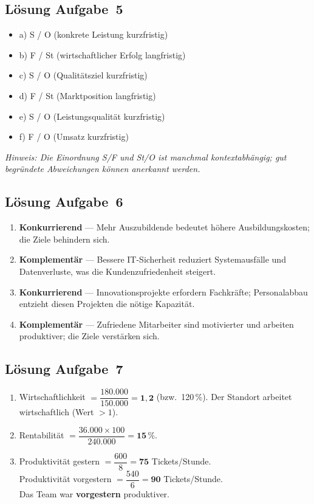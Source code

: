 \documentclass[11pt, a4paper]{article}
\begin{document}
\subsection*{Lösung Aufgabe~5}

\begin{itemize}
  \item a) S / O (konkrete Leistung kurzfristig)
  \item b) F / St (wirtschaftlicher Erfolg langfristig)
  \item c) S / O (Qualitätsziel kurzfristig)
  \item d) F / St (Marktposition langfristig)
  \item e) S / O (Leistungsqualität kurzfristig)
  \item f) F / O (Umsatz kurzfristig)
\end{itemize}

\textit{Hinweis: Die Einordnung S/F und St/O ist manchmal kontextabhängig; gut begründete Abweichungen
können anerkannt werden.}

\subsection*{Lösung Aufgabe~6}

\begin{enumerate}[label=(\alph*)]
  \item \textbf{Konkurrierend} --- Mehr Auszubildende bedeutet höhere Ausbildungskosten; die Ziele
  behindern sich.
  \item \textbf{Komplementär} --- Bessere IT-Sicherheit reduziert Systemausfälle und Datenverluste,
  was die Kundenzufriedenheit steigert.
  \item \textbf{Konkurrierend} --- Innovationsprojekte erfordern Fachkräfte; Personalabbau
  entzieht diesen Projekten die nötige Kapazität.
  \item \textbf{Komplementär} --- Zufriedene Mitarbeiter sind motivierter und arbeiten produktiver;
  die Ziele verstärken sich.
\end{enumerate}

\subsection*{Lösung Aufgabe~7}

\begin{enumerate}[label=(\alph*)]
  \item Wirtschaftlichkeit $= \dfrac{180.000}{150.000} = \mathbf{1{,}2}$ (bzw.\ 120\,\%).
  Der Standort arbeitet wirtschaftlich (Wert $>1$).

  \item Rentabilität $= \dfrac{36.000 \times 100}{240.000} = \mathbf{15\,\%}$.

  \item Produktivität gestern $= \dfrac{600}{8} = \mathbf{75}$ Tickets/Stunde.\\
  Produktivität vorgestern $= \dfrac{540}{6} = \mathbf{90}$ Tickets/Stunde.\\
  Das Team war \textbf{vorgestern} produktiver.
\end{enumerate}
\end{document}

